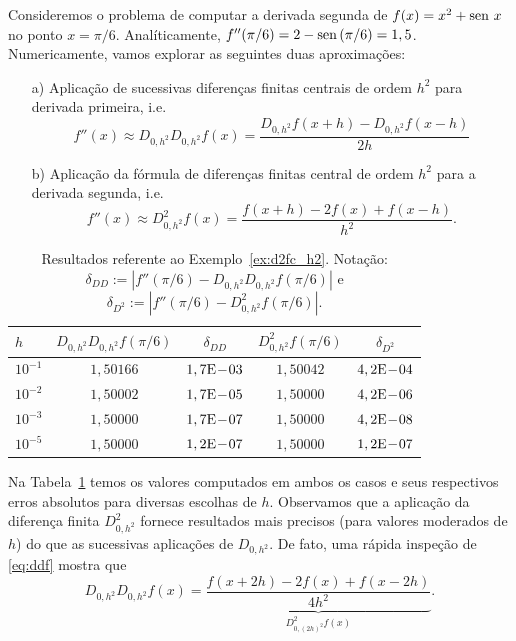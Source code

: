\begin{ex}\label{ex:d2fc_h2}
  Consideremos o problema de computar a derivada segunda de $f(x) = x^2 + \operatorname{sen}\, x$ no ponto $x=\pi/6$. Analíticamente, $f''(\pi/6) = 2 - \operatorname{sen}\,(\pi/6) = 1,5$. Numericamente, vamos explorar as seguintes duas aproximações:
  \begin{enumerate}
  \item[a)] Aplicação de sucessivas diferenças finitas centrais de ordem $h^2$ para derivada primeira, i.e.
    \begin{equation}\label{eq:ddf}
      f''(x) \approx D_{0,h^2}D_{0,h^2}f(x) = \frac{D_{0,h^2}f(x+h) - D_{0,h^2}f(x-h)}{2h}
    \end{equation}
  \item[b)] Aplicação da fórmula de diferenças finitas central de ordem $h^2$ para a derivada segunda, i.e.
    \begin{equation}
      f''(x) \approx D_{0,h^2}^2 f(x) = \frac{f(x+h) - 2f(x) + f(x-h)}{h^2}.
    \end{equation}
  \end{enumerate}

\begin{table}[h!]
  \centering
  \caption{Resultados referente ao Exemplo~\ref{ex:d2fc_h2}. Notação: $\delta_{DD}:=|f''(\pi/6)-D_{0,h^2}D_{0,h^2}f(\pi/6)|$ e $\delta_{D^2}:=|f''(\pi/6)-D^2_{0,h^2}f(\pi/6)|$.}
  \begin{tabular}{l|cc|cc}
    $h$ & $D_{0,h^2}D_{0,h^2}f(\pi/6)$ & $\delta_{DD}$ & $D^2_{0,h^2}f(\pi/6)$ & $\delta_{D^2}$ \\ \hline
    $10^{-1}$ &  $1,50166$ & $1,7\mathrm{E}\!-\!03$ & $1,50042$ & $4,2\mathrm{E}\!-\!04$ \\
    $10^{-2}$ &  $1,50002$ & $1,7\mathrm{E}\!-\!05$ & $1,50000$ & $4,2\mathrm{E}\!-\!06$ \\
    $10^{-3}$ &  $1,50000$ & $1,7\mathrm{E}\!-\!07$ & $1,50000$ & $4,2\mathrm{E}\!-\!08$ \\
    $10^{-5}$ &  $1,50000$ & $1,2\mathrm{E}\!-\!07$ & $1,50000$ & $1,2\mathrm{E}\!-\!07$ \\\hline
  \end{tabular}
  \label{tab:ex_d2fc_h2}
\end{table}

Na Tabela~\ref{tab:ex_d2fc_h2} temos os valores computados em ambos os casos e seus respectivos erros absolutos para diversas escolhas de $h$. Observamos que a aplicação da diferença finita $D^2_{0,h^2}$ fornece resultados mais precisos (para valores moderados de $h$) do que as sucessivas aplicações de $D_{0,h^2}$. De fato, uma rápida inspeção de \eqref{eq:ddf} mostra que
\begin{equation}
  D_{0,h^2}D_{0,h^2}f(x) = \underbrace{\frac{f(x+2h) - 2f(x) + f(x-2h)}{4h^2}}_{D^2_{0,(2h)^2}f(x)}.
\end{equation}
\end{ex}

